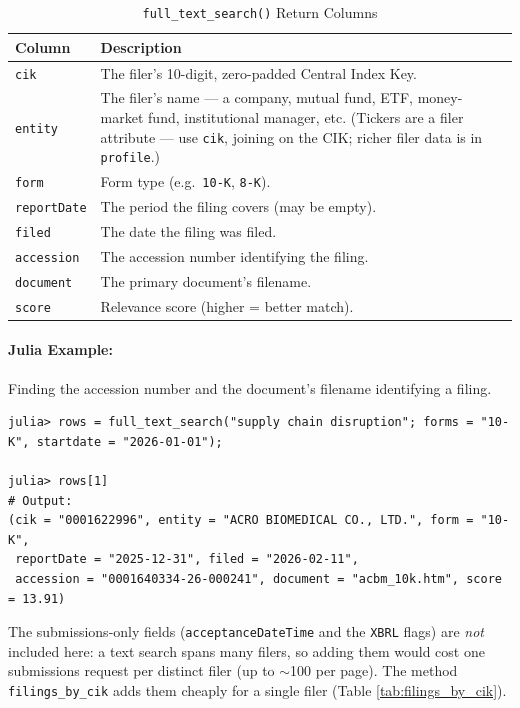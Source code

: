 \documentclass[11pt,a4paper]{report}
\begin{document}
\begin{table}[t]
\centering
\caption{\texttt{full\_text\_search()} Return Columns}
\label{tab:full_text_search}
\begin{tabular}{@{}p{}p{}@{}}
\toprule
\textbf{Column} & \textbf{Description} \\
\midrule
\texttt{cik}        & The filer's 10-digit, zero-padded Central Index Key. \\
\texttt{entity}     & The filer's name --- a company, mutual fund, ETF, money-market fund, institutional manager, etc. (Tickers are a filer attribute --- use \texttt{cik}, joining on the CIK; richer filer data is in \texttt{profile}.) \\
\texttt{form}       & Form type (e.g.\ \texttt{10-K}, \texttt{8-K}). \\
\texttt{reportDate} & The period the filing covers (may be empty). \\
\texttt{filed}      & The date the filing was filed. \\
\texttt{accession}  & The accession number identifying the filing. \\
\texttt{document}   & The primary document's filename. \\
\texttt{score}      & Relevance score (higher = better match). \\
\bottomrule
\end{tabular}
\end{table}

\paragraph{Julia Example:} Finding the accession number and the document's filename identifying a filing.
\begin{lstlisting}
julia> rows = full_text_search("supply chain disruption"; forms = "10-K", startdate = "2026-01-01");

julia> rows[1]
# Output:
(cik = "0001622996", entity = "ACRO BIOMEDICAL CO., LTD.", form = "10-K",
 reportDate = "2025-12-31", filed = "2026-02-11",
 accession = "0001640334-26-000241", document = "acbm_10k.htm", score = 13.91)
\end{lstlisting}
\medskip

\noindent The submissions-only fields
(\texttt{acceptanceDateTime} and the \texttt{XBRL} flags) are \emph{not} included here: a text
search spans many filers, so adding them would cost one submissions request per
distinct filer (up to $\sim$100 per page). The method \texttt{filings\_by\_cik} adds them cheaply
for a single filer (Table \ref{tab:filings_by_cik}).
\end{document}
